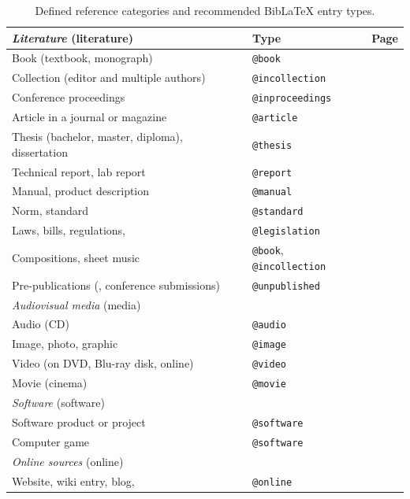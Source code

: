 \begin{table}[htbp]
\caption{Defined reference categories and recommended BibLaTeX entry types.}
\label{tab:references-and-entry-types}
\centering
\begin{tabular}{@{}llc@{}}
	\toprule
	\emph{Literature} (\textsf{literature}) & Type & Page\\
	\midrule
	Book (textbook, monograph) & \texttt{@book} & \pageref{sec:@book}\\
	Collection (editor and multiple authors) & \texttt{@incollection} & \pageref{sec:@incollection} \\
	Conference proceedings & \texttt{@inproceedings} & \pageref{sec:@inproceedings}\\
	Article in a journal or magazine & \texttt{@article} & \pageref{sec:@article}\\
	Thesis (bachelor, master, diploma), dissertation & \texttt{@thesis} & \pageref{sec:@thesis}\\
	Technical report, lab report & \texttt{@report} & \pageref{sec:@report}\\
	Manual, product description & \texttt{@manual} & \pageref{sec:@manual}\\
	Norm, standard & \texttt{@standard} & \pageref{sec:@standard}\\
	Laws, bills, regulations, \etc & \texttt{@legislation} & \pageref{sec:@legislation}\\
	Compositions, sheet music & \texttt{@book}, \texttt{@incollection} & \pageref{sec:sheet-music}\\
	Pre-publications (\eg, conference submissions) & \texttt{@unpublished} & \pageref{sec:@unpublished}\\
	\addlinespace
%
	\midrule
	\emph{Audiovisual media} (\textsf{media}) & & \\
	\midrule
	Audio (CD) & \texttt{@audio} & \pageref{sec:@audio}\\
	Image, photo, graphic & \texttt{@image} & \pageref{sec:@image}\\
	Video (on DVD, Blu-ray disk, online) & \texttt{@video} & \pageref{sec:@video}\\
	Movie (cinema) & \texttt{@movie} & \pageref{sec:@movie}\\
	\addlinespace
%
	\midrule
	\emph{Software} (\textsf{software}) & & \\
	\midrule
	Software product or project & \texttt{@software} & \pageref{sec:@software}\\
	Computer game & \texttt{@software} & \pageref{sec:@software}\\
	\addlinespace
%
	\midrule
	\emph{Online sources} (\textsf{online}) & & \\
	\midrule
	Website, wiki entry, blog, \etc & \texttt{@online} & \pageref{sec:@online-www} \\
	\bottomrule
\end{tabular}
\end{table}


